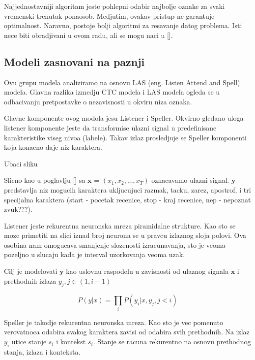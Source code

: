 \documentclass[a4paper]{article}
\begin{document}
Najjednostavniji algoritam jeste pohlepni odabir najbolje oznake za svaki vremenski trenutak ponaosob.  Medjutim, ovakav pristup ne garantuje optimalnost.  Naravno,  postoje bolji algoritmi za resavanje datog problema. Isti nece biti obradjivani u ovom radu, ali se mogu naci u [].

\subsection{Modeli zasnovani na paznji}

Ovu grupu modela analiziramo na osnovu LAS (eng.  Listen Attend and Spell) modela.  Glavna razlika izmedju CTC modela i LAS modela ogleda se u odbacivanju pretpostavke o nezavisnosti u okviru niza oznaka.  

\bigskip
Glavne komponente ovog modola jesu Listener i Speller.  Okvirno gledano uloga listener komponente jeste da transformise ulazni signal u predefinisane karakteristike viseg nivoa (labele).  Takav izlaz prosledjuje se Speller komponenti koja konacno daje niz karaktera. 

\bigskip
Ubaci sliku

\bigskip

Slicno kao u poglavlju [] sa $\textbf{x}$ = $(x_1,  x_2,  ...,  x_T)$ oznacavamo ulazni signal.  $\textbf{y}$ predstavlja niz mogucih karaktera ukljucujuci razmak,  tacku,  zarez,  apostrof,  i tri specijalna karaktera (start - pocetak recenice,  stop - kraj recenice,  nep - nepoznat zvuk???).

\bigskip

Listener jeste rekurentna neuronska mreza piramidalne strukture.  Kao sto se moze primetiti na slici iznad broj neurona se u pravcu izlaznog sloja polovi.  Ova osobina nam omogucava smanjenje slozenosti izracunavanja,  sto je veoma pozeljno u slucaju kada je interval uzorkovanja veoma uzak.

\bigskip
Cilj je modelovati $\textbf{y}$ kao uslovnu raspodelu u zavisnosti od ulaznog signala $\textbf{x}$ i prethodnih izlaza $y_j,  j \in (1,  i-1)$

\begin{equation}
\label{eq:chain}
P(y | x) = \prod_i P(y_i | x,  y_j,  j < i)
\end{equation}

\bigskip

Speller je takodje rekurentna neuronska mreza.  Kao sto je vec pomenuto verovatnoca odabira svakog karaktera zavisi od odabira svih prethodnih.  Na izlaz $y_i$ utice stanje $s_i$ i kontekst $s_i$.  Stanje se racuna rekurentno na osnovu prethodnog stanja,  izlaza i konteksta.
\end{document}
